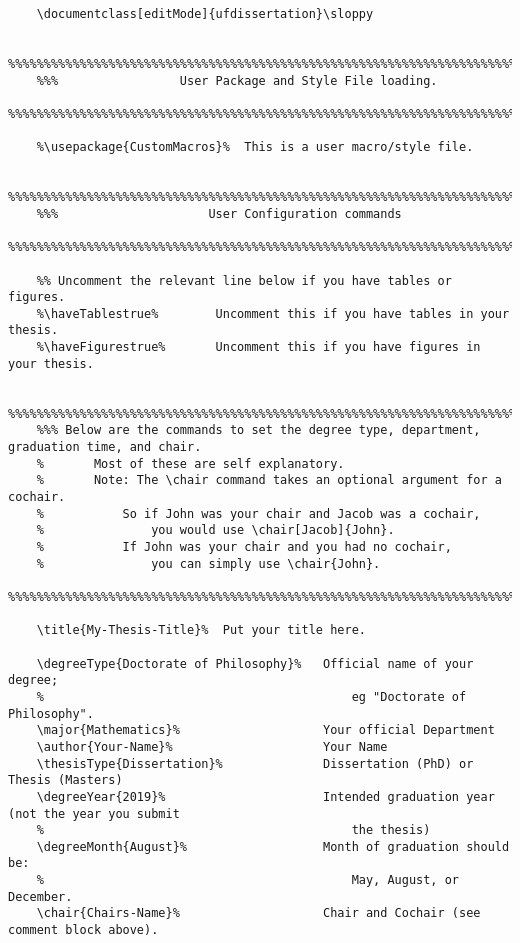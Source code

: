 \documentclass{article}
\begin{document}
    \begin{verbatim}
    \documentclass[editMode]{ufdissertation}\sloppy
    
    %%%%%%%%%%%%%%%%%%%%%%%%%%%%%%%%%%%%%%%%%%%%%%%%%%%%%%%%%%%%%%%%%%%%%%%%%%%%%%%%
    %%%                 User Package and Style File loading.
    %%%%%%%%%%%%%%%%%%%%%%%%%%%%%%%%%%%%%%%%%%%%%%%%%%%%%%%%%%%%%%%%%%%%%%%%%%%%%%%%
    
    %\usepackage{CustomMacros}%  This is a user macro/style file.
    
    %%%%%%%%%%%%%%%%%%%%%%%%%%%%%%%%%%%%%%%%%%%%%%%%%%%%%%%%%%%%%%%%%%%%%%%%%%%%%%%%
    %%%                     User Configuration commands
    %%%%%%%%%%%%%%%%%%%%%%%%%%%%%%%%%%%%%%%%%%%%%%%%%%%%%%%%%%%%%%%%%%%%%%%%%%%%%%%%
    
    %% Uncomment the relevant line below if you have tables or figures.
    %\haveTablestrue%        Uncomment this if you have tables in your thesis.
    %\haveFigurestrue%       Uncomment this if you have figures in your thesis.
    
    %%%%%%%%%%%%%%%%%%%%%%%%%%%%%%%%%%%%%%%%%%%%%%%%%%%%%%%%%%%%%%%%%%%%%%%%%%%%%%%%
    %%% Below are the commands to set the degree type, department, graduation time, and chair. 
    %       Most of these are self explanatory. 
    %       Note: The \chair command takes an optional argument for a cochair. 
    %           So if John was your chair and Jacob was a cochair, 
    %               you would use \chair[Jacob]{John}.
    %           If John was your chair and you had no cochair, 
    %               you can simply use \chair{John}.
    %%%%%%%%%%%%%%%%%%%%%%%%%%%%%%%%%%%%%%%%%%%%%%%%%%%%%%%%%%%%%%%%%%%%%%%%%%%%%%%%
    
    \title{My-Thesis-Title}%  Put your title here.
    
    \degreeType{Doctorate of Philosophy}%   Official name of your degree; 
    %                                           eg "Doctorate of Philosophy".
    \major{Mathematics}%                    Your official Department
    \author{Your-Name}%                     Your Name
    \thesisType{Dissertation}%              Dissertation (PhD) or Thesis (Masters)
    \degreeYear{2019}%                      Intended graduation year (not the year you submit 
    %                                           the thesis)
    \degreeMonth{August}%                   Month of graduation should be: 
    %                                           May, August, or December.
    \chair{Chairs-Name}%                    Chair and Cochair (see comment block above).
    

\end{verbatim}
\end{document}
